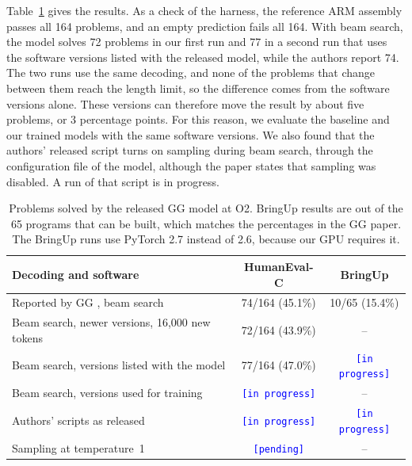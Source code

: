 \documentclass{article}
\newcommand{\placeholder}[1]{\texttt{\textcolor{blue}{[#1]}}}
\newif\iftracked
\newcommand{\added}[1]{\iftracked\hl{#1}\else#1\fi}
\newcommand{\deleted}[1]{\iftracked\textcolor{red}{\st{#1}}\ \fi}
\newcommand{\addedbox}[1]{\iftracked\colorbox{addedbg}{#1}\else#1\fi}
\begin{document}
\deleted{Result pending. The harness requires the data and test programs to be built with the same compiler toolchain as the official GG data (Section~\ref{sec:method}). We will report the pass rates here once this step is complete.}

\added{Table~\ref{tab:baseline} gives the results. As a check of the harness, the reference ARM assembly passes all 164 problems, and an empty prediction fails all 164. With beam search, the model solves 72 problems in our first run and 77 in a second run that uses the software versions listed with the released model, while the authors report 74.} \added{The two runs use the same decoding, and none of the problems that change between them reach the length limit, so the difference comes from the software versions alone. These versions can therefore move the result by about five problems, or 3 percentage points.} \added{For this reason, we evaluate the baseline and our trained models with the same software versions. We also found that the authors' released script turns on sampling during beam search, through the configuration file of the model, although the paper states that sampling was disabled. A run of that script is in progress.}

\begin{table}[h]
\centering
\caption{\added{Problems solved by the released GG model at O2. BringUp results are out of the 65 programs that can be built, which matches the percentages in the GG paper. The BringUp runs use PyTorch 2.7 instead of 2.6, because our GPU requires it.}}
\label{tab:baseline}
\small
\addedbox{%
\begin{tabular}{@{}lcc@{}}
\toprule
Decoding and software & HumanEval-C & BringUp \\
\midrule
Reported by GG \citep{gg}, beam search & 74/164 (45.1\%) & 10/65 (15.4\%) \\
Beam search, newer versions, 16{,}000 new tokens & 72/164 (43.9\%) & -- \\
Beam search, versions listed with the model & 77/164 (47.0\%) & \placeholder{in progress} \\
Beam search, versions used for training & \placeholder{in progress} & -- \\
Authors' scripts as released & \placeholder{in progress} & \placeholder{in progress} \\
Sampling at temperature~1 & \placeholder{pending} & -- \\
\bottomrule
\end{tabular}}
\end{table}
\end{document}
